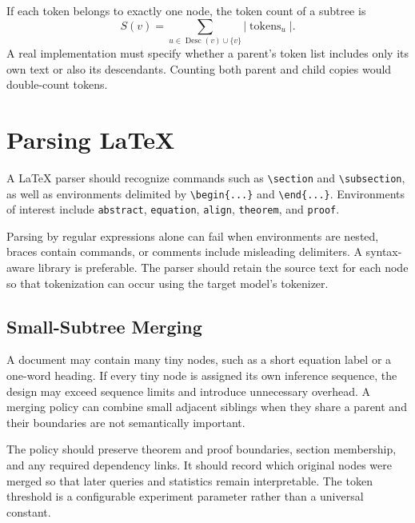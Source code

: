 \documentclass{article}
\begin{document}
If each token belongs to exactly one node, the token count of a subtree is
\begin{equation}
S(v)=\sum_{u\in \operatorname{Desc}(v)\cup\{v\}}
|\operatorname{tokens}_u|.
\end{equation}
A real implementation must specify whether a parent's token list includes only its own text or also its descendants. Counting both parent and child copies would double-count tokens.

\section{Parsing LaTeX}
A LaTeX parser should recognize commands such as \verb|\section| and \verb|\subsection|, as well as environments delimited by \verb|\begin{...}| and \verb|\end{...}|. Environments of interest include \texttt{abstract}, \texttt{equation}, \texttt{align}, \texttt{theorem}, and \texttt{proof}.

Parsing by regular expressions alone can fail when environments are nested, braces contain commands, or comments include misleading delimiters. A syntax-aware library is preferable. The parser should retain the source text for each node so that tokenization can occur using the target model's tokenizer.

\subsection{Small-Subtree Merging}
A document may contain many tiny nodes, such as a short equation label or a one-word heading. If every tiny node is assigned its own inference sequence, the design may exceed sequence limits and introduce unnecessary overhead. A merging policy can combine small adjacent siblings when they share a parent and their boundaries are not semantically important.

The policy should preserve theorem and proof boundaries, section membership, and any required dependency links. It should record which original nodes were merged so that later queries and statistics remain interpretable. The token threshold is a configurable experiment parameter rather than a universal constant.
\end{document}
